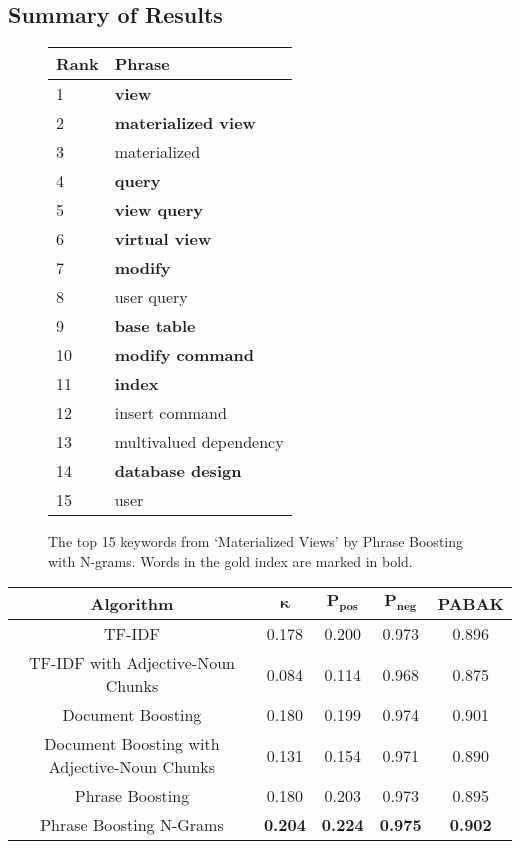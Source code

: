 \subsection{Summary of Results}
\label{sec:sum}



\begin{figure}
\caption{The top 15 keywords from `Materialized Views' by Phrase Boosting with N-grams. Words in the gold index are marked in bold.}
\label{fig:top_15}
\begin{tabular}{|l|l|}
\hline
Rank & Phrase \\
\hline
1 & \textbf{view} \\
\hline
2 & \textbf{materialized view} \\
\hline
3 & materialized \\
\hline
4 & \textbf{query} \\
\hline
5 & \textbf{view query} \\
\hline
6 & \textbf{virtual view} \\
\hline
7 & \textbf{modify} \\
\hline
8 & user query \\
\hline
9 & \textbf{base table} \\
\hline
10 & \textbf{modify command} \\
\hline
11 & \textbf{index} \\
\hline
12 & insert command \\
\hline
13 & multivalued dependency \\
\hline
14 & \textbf{database design} \\
\hline
15 & user \\
\hline
\end{tabular}
\end{figure}


\begin{figure*}[!ht]
\caption{}
\label{fig:main_result}
\begin{tabular}{|c|c|c|c|c|}
\hline
\textbf{Algorithm} & $\mathbf{\kappa}$ & $\mathbf{P_{\text{pos}}}$ & $\mathbf{P_{\text{neg}}}$ & \textbf{PABAK} \\
\hline
TF-IDF & 0.178 & 0.200 & 0.973 & 0.896 \\
\hline
TF-IDF with Adjective-Noun Chunks & 0.084 & 0.114 & 0.968 & 0.875 \\
\hline
Document Boosting & 0.180 & 0.199 & 0.974 & 0.901 \\
\hline
Document Boosting with Adjective-Noun Chunks & 0.131 & 0.154 & 0.971 & 0.890 \\
\hline
Phrase Boosting & 0.180 & 0.203 & 0.973 & 0.895 \\
\hline
Phrase Boosting N-Grams & \textbf{0.204} & \textbf{0.224} & \textbf{0.975} & \textbf{0.902} \\
\hline
\end{tabular}
\end{figure*}

